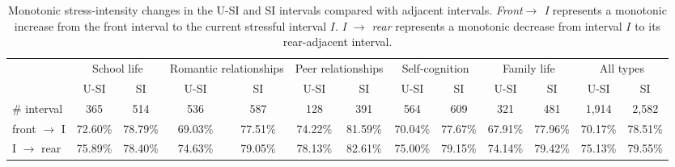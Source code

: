 \documentclass[5p,times,numbers,authoryear]{elsarticle}
\begin{document}
\begin{table*}
\begin{center}
\caption{\small{Monotonic stress-intensity changes in the U-SI and SI intervals compared with adjacent intervals.
 \emph{Front$ \rightarrow$ I} represents a monotonic increase from the front interval to the current stressful interval $I$.
\emph{I $\rightarrow$ rear} represents a monotonic decrease from interval $I$ to its rear-adjacent interval.
}}
\small{
\begin{tabular}{l cccccc cccccc} \\\hline
\multirow{2}{1cm}{}
&\multicolumn{2}{c}{School life}
&\multicolumn{2}{c}{Romantic relationships}
&\multicolumn{2}{c}{Peer relationships}
&\multicolumn{2}{c}{Self-cognition}
&\multicolumn{2}{c}{Family life}
&\multicolumn{2}{c}{All types}\\
&U-SI	    &	SI	        &U-SI	    &SI	        &U-SI	   &SI	
&U-SI	    &	SI	        &	U-SI	&SI	        &U-SI	   &SI\\  \hline
\# interval         &   365	        &	514	        &	536	        &	587	        &128	    &	391	        &	564	           &	609	            &	321	        &	481	        &	1,914	    &2,582	 \\
front $\rightarrow$ I &	72.60\% &	78.79\% &	69.03\% 	&77.51\%   &74.22\%    &81.59\%    &70.04\%    &77.67\%  &67.91\%     &77.96\%    &70.17\%    &78.51\% \\
I $\rightarrow$ rear  &	75.89\% &	78.40\% &	74.63\% 	&79.05\%   &78.13\%    &82.61\%    &75.00\%    &79.15\%   &74.14\%    &79.42\%    &75.13\%    & 79.55\%\\ \hline
\end{tabular}}%
\label{tab:fontrear}
\end{center}
\end{table*}
\end{document}
